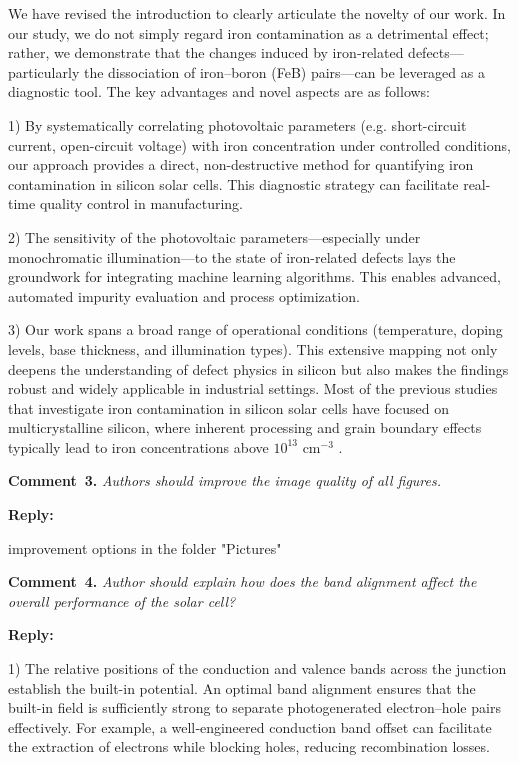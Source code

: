 \documentclass[a4paper,fleqn]{cas-sc}
\begin{document}
We have revised the introduction to clearly articulate the novelty of our work. In our study, we do not simply regard iron contamination as a detrimental effect; rather, we demonstrate that the changes induced by iron‐related defects—particularly the dissociation of iron–boron (FeB) pairs—can be leveraged as a diagnostic tool. The key advantages and novel aspects are as follows:


1) By systematically correlating photovoltaic parameters (e.g. short-circuit current, open-circuit voltage) with iron concentration under controlled conditions, our approach provides a direct, non-destructive method for quantifying iron contamination in silicon solar cells. This diagnostic strategy can facilitate real-time quality control in manufacturing.

2) The sensitivity of the photovoltaic parameters—especially under monochromatic illumination—to the state of iron-related defects lays the groundwork for integrating machine learning algorithms. This enables advanced, automated impurity evaluation and process optimization.

3) Our work spans a broad range of operational conditions (temperature, doping levels, base thickness, and illumination types). This extensive mapping not only deepens the understanding of defect physics in silicon but also makes the findings robust and widely applicable in industrial settings. Most of the previous studies that investigate iron contamination in silicon solar cells have focused on multicrystalline silicon, where inherent processing and grain boundary effects typically lead to iron concentrations above $10^{13}$ cm$^{-3}$ \cite{abbott2014}.


\noindent
\textcolor[rgb]{0.00,0.50,1.00}{\textbf{Comment~3.}}
\emph{Authors should improve the image quality of all figures.}

\noindent
\textcolor[rgb]{0.51,0.00,0.00}{\textbf{Reply:}}

improvement options in the folder "Pictures"


\noindent
\textcolor[rgb]{0.00,0.50,1.00}{\textbf{Comment~4.}}
\emph{Author should explain how does the band alignment affect the overall performance of the solar cell?}

\noindent
\textcolor[rgb]{0.51,0.00,0.00}{\textbf{Reply:}}

1) The relative positions of the conduction and valence bands across the junction establish the built-in potential. An optimal band alignment ensures that the built-in field is sufficiently strong to separate photogenerated electron–hole pairs effectively. For example, a well‑engineered conduction band offset can facilitate the extraction of electrons while blocking holes, reducing recombination losses.
\end{document}
